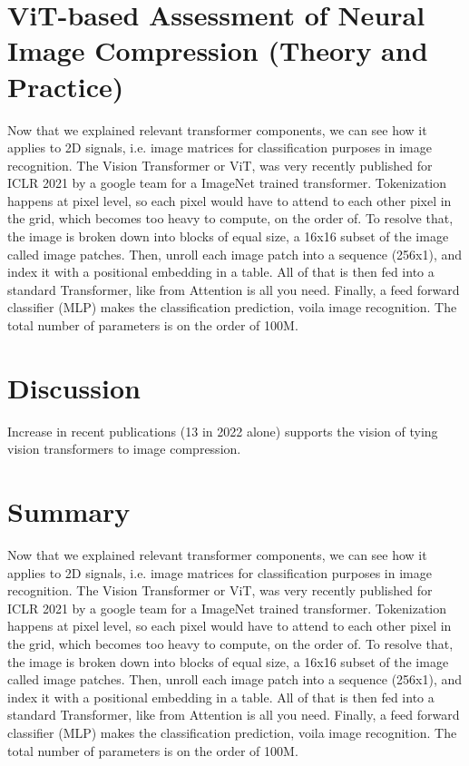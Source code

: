 \documentclass[pdftex,11pt,titlepage,twoside,openright]{report}
\begin{document}
\ThinHRule

\newpage


\chapter{ViT-based Assessment of Neural Image Compression (Theory and Practice)}

Now that we explained relevant transformer components, we can see how it applies to 2D signals, i.e. image matrices for classification purposes in image recognition.
The Vision Transformer or ViT, was very recently published for ICLR 2021 by a google team for a ImageNet trained transformer.
Tokenization happens at pixel level, so each pixel would have to attend to  each other pixel in the grid, which becomes too heavy to compute, on the order of. 
To resolve that, the image is broken down into blocks of equal size, a 16x16 subset of the image called image patches. Then, unroll each image patch into a sequence (256x1), and index it with a positional embedding in a table. All of that is then fed into a standard Transformer, like from Attention is all you need. Finally, a feed forward classifier (MLP) makes the classification prediction, voila image recognition.
The total number of parameters is on the order of 100M.

\ThinHRule

\newpage


\chapter{Discussion}

Increase in recent publications (13 in 2022 alone) supports the vision of tying vision transformers to image compression.

\ThinHRule

\newpage


\cleardoublepage
\chapter{Summary}

Now that we explained relevant transformer components, we can see how it applies to 2D signals, i.e. image matrices for classification purposes in image recognition.
The Vision Transformer or ViT, was very recently published for ICLR 2021 by a google team for a ImageNet trained transformer.
Tokenization happens at pixel level, so each pixel would have to attend to  each other pixel in the grid, which becomes too heavy to compute, on the order of. 
To resolve that, the image is broken down into blocks of equal size, a 16x16 subset of the image called image patches. Then, unroll each image patch into a sequence (256x1), and index it with a positional embedding in a table. All of that is then fed into a standard Transformer, like from Attention is all you need. Finally, a feed forward classifier (MLP) makes the classification prediction, voila image recognition.
The total number of parameters is on the order of 100M.
\end{document}
